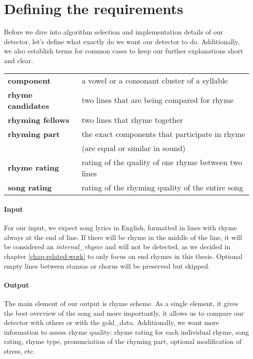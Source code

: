 \section{Defining the requirements}\label{defining_the_requirements}
Before we dive into algorithm selection and implementation details of our detector, let's define what exactly do we want our detector to do. Additionally, we also establish terms for common cases to keep our further explanations short and clear.
\begin{table}[h!]
	\centering
	\begin{tabular}{>{\bfseries}l l} 
		component & a vowel or a consonant cluster of a syllable\\
		rhyme candidates & two lines that are being compared for rhyme \\
		rhyming fellows & two lines that rhyme together\\
		rhyming part & the exact components that participate in rhyme \\&(are equal or similar in sound)\\
		rhyme rating & rating of the quality of one rhyme between two lines\\
		song rating & rating of the rhyming quality of the entire song\\
	\end{tabular}
	\label{terms}
\end{table}

\paragraph{Input}
For our input, we expect song lyrics in English, formatted in lines with rhyme always at the end of line. If there will be rhyme in the middle of the line, it will be considered an \textit{\gls{internal_rhyme}} and will not be detected, as we decided in chapter \ref{chap-related-work} to only focus on end rhymes in this thesis. Optional empty lines between stanzas or chorus will be preserved but skipped.

\paragraph{Output}
The main element of our output is rhyme scheme. As a single element, it gives the best overview of the song and more importantly, it allows us to compare our detector with others or with the \gls{gold_data}. Additionally, we want more information to assess rhyme quality: rhyme rating for each individual rhyme, song rating, rhyme type, pronunciation of the rhyming part, optional modification of stress, etc.


